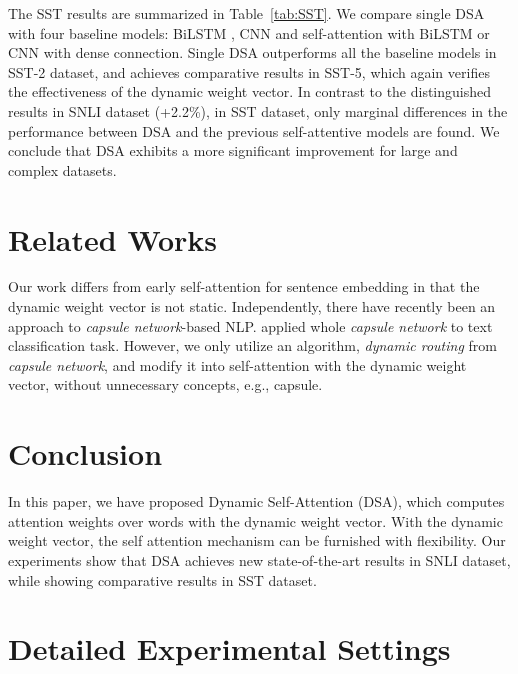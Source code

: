 \documentclass[11pt,a4paper]{article}
\newcommand{\appendixhead}{\centering\textbf{\huge Appendix}
\vspace{0.25in}}
\begin{document}
The SST results are summarized in Table~\ref{tab:SST}. We compare single DSA with four baseline models: BiLSTM \cite{baseline_lstm_bilstm}, CNN \cite{yoonkim} and self-attention with BiLSTM or CNN with dense connection. Single DSA outperforms all the baseline models in SST-2 dataset, and achieves comparative results in SST-5, which again verifies the effectiveness of the dynamic weight vector. In contrast to the distinguished results in SNLI dataset (+2.2\%), in SST dataset, only marginal differences in the performance between DSA and the previous self-attentive models are found. We conclude that DSA exhibits a more significant improvement for large and complex datasets.





\section{Related Works}\label{relatedworks}




Our work differs from early self-attention for sentence embedding \cite{Yang,hierarchical,self-attentive,disan} in that the dynamic weight vector is not static. Independently, there have recently been an approach to \textit{capsule network}-based NLP. \citet{capsuletext2} applied whole \textit{capsule network} to text classification task. However, we only utilize an algorithm, \textit{dynamic routing} from \textit{capsule network}, and modify it into self-attention with the dynamic weight vector, without unnecessary concepts, e.g., capsule.

\section{Conclusion}\label{conclusion}

In this paper, we have proposed Dynamic Self-Attention (DSA), which computes attention weights over words with the dynamic weight vector. With the dynamic weight vector, the self attention mechanism can be furnished with flexibility. Our experiments show that DSA achieves new state-of-the-art results in SNLI dataset, while showing comparative results in SST dataset.








\twocolumn[\appendixhead]
\section*{Detailed Experimental Settings}\label{supplemn}
\renewcommand{\thesubsection}{\Alph{subsection}}
\end{document}
